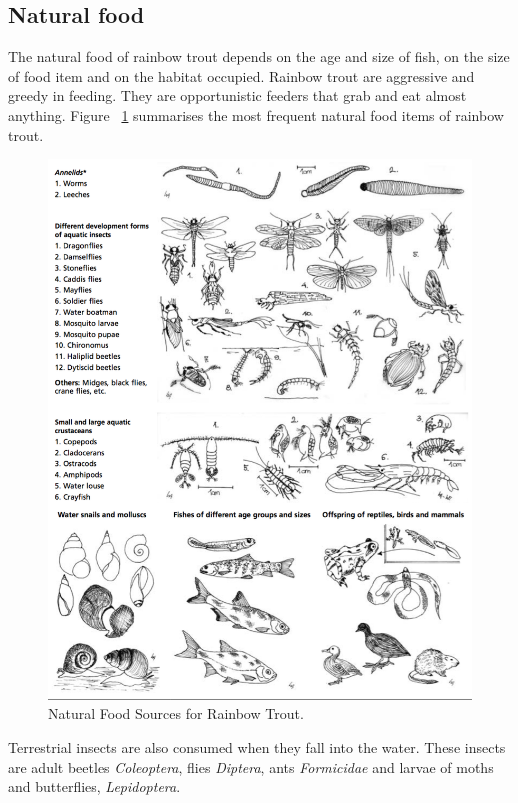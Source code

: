 \subsection{Natural food} The natural food of rainbow trout depends on the age and size of fish, on the size of food item and on the habitat occupied. Rainbow trout are aggressive and greedy in feeding. They are opportunistic feeders that grab and eat almost anything. Figure ~\ref{fig:NaturalFood} summarises the most frequent natural food items of rainbow trout.


\begin{figure}[H]
  \centering
   \includegraphics[scale = 0.5]{images/NaturalFood.png}
  \caption{Natural Food Sources for Rainbow Trout.}
   \label{fig:NaturalFood}
\end{figure}

Terrestrial insects are also consumed when they fall into the water. These insects are adult beetles {\it Coleoptera}, flies {\it Diptera}, ants {\it Formicidae} and larvae of moths and butterflies, {\it Lepidoptera}. 

